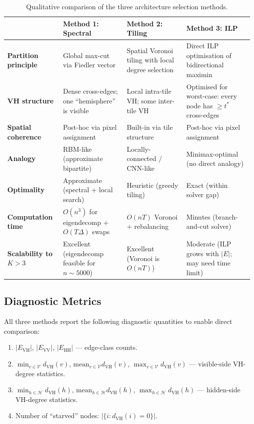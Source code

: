 \documentclass[11pt,a4paper]{article}
\newcommand{\VV}{\mathcal{V}}
\newcommand{\HH}{\mathcal{H}}
\begin{document}
\begin{table}[h]
\centering
\caption{Qualitative comparison of the three architecture selection methods.}
\label{tab:comparison}
\begin{tabular}{@{}p{3.2cm}p{3.8cm}p{3.8cm}p{3.8cm}@{}}
\toprule
& \textbf{Method 1: Spectral} & \textbf{Method 2: Tiling} & \textbf{Method 3: ILP} \\
\midrule
\textbf{Partition principle} & Global max-cut via Fiedler vector & Spatial Voronoi tiling with local degree selection & Direct ILP optimisation of bidirectional maximin \\[4pt]
\textbf{VH structure} & Dense cross-edges; one ``hemisphere'' is visible & Local intra-tile VH; some inter-tile VH & Optimised for worst-case: every node has $\geq t^*$ cross-edges \\[4pt]
\textbf{Spatial coherence} & Post-hoc via pixel assignment & Built-in via tile structure & Post-hoc via pixel assignment \\[4pt]
\textbf{Analogy} & RBM-like (approximate bipartite) & Locally-connected / CNN-like & Minimax-optimal (no direct analogy) \\[4pt]
\textbf{Optimality} & Approximate (spectral + local search) & Heuristic (greedy tiling) & Exact (within solver gap) \\[4pt]
\textbf{Computation time} & $O(n^3)$ for eigendecomp $+$ $O(T\Delta)$ swaps & $O(n T)$ Voronoi $+$ rebalancing & Minutes (branch-and-cut solver) \\[4pt]
\textbf{Scalability to $K>3$} & Excellent (eigendecomp feasible for $n\sim5000$) & Excellent (Voronoi is $O(nT)$) & Moderate (ILP grows with $|E|$; may need time limit) \\
\bottomrule
\end{tabular}
\end{table}

\subsection{Diagnostic Metrics}

All three methods report the following diagnostic quantities to enable direct comparison:
\begin{enumerate}[nosep]
  \item $|E_{\mathrm{VH}}|$, $|E_{\mathrm{VV}}|$, $|E_{\mathrm{HH}}|$ --- edge-class counts.
  \item $\min_{v\in\VV} d_{\mathrm{VH}}(v)$, $\mathrm{mean}_{v\in\VV} d_{\mathrm{VH}}(v)$, $\max_{v\in\VV} d_{\mathrm{VH}}(v)$ --- visible-side VH-degree statistics.
  \item $\min_{h\in\HH} d_{\mathrm{VH}}(h)$, $\mathrm{mean}_{h\in\HH} d_{\mathrm{VH}}(h)$, $\max_{h\in\HH} d_{\mathrm{VH}}(h)$ --- hidden-side VH-degree statistics.
  \item Number of ``starved'' nodes: $|\{i : d_{\mathrm{VH}}(i)=0\}|$.
\end{enumerate}
\end{document}

